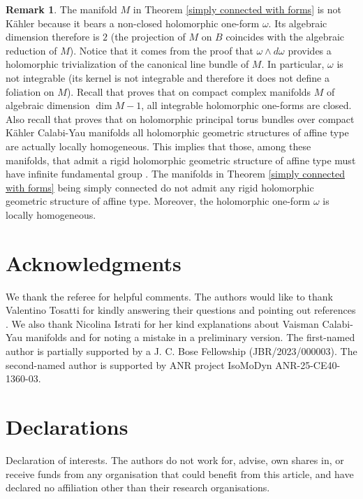 \documentclass[12pt,reqno]{amsart}
\theoremstyle{definition}
\newtheorem{remark}[theorem]{Remark}
\numberwithin{equation}{section}
\begin{document}
\begin{remark}
The manifold $M$ in Theorem \ref{simply connected with forms} is not K\"ahler because it bears a non-closed 
holomorphic one-form $\omega$. Its algebraic dimension therefore is $2$ (the projection of $M$ on $B$ 
coincides with the algebraic reduction of $M$). Notice that it comes from the proof that $\omega \wedge d 
\omega$ provides a holomorphic trivialization of the canonical line bundle of $M$. In particular, $\omega$ 
is not integrable (its kernel is not integrable and therefore it does not define a foliation on $M$). 
Recall that \cite[Proposition 1]{Br} proves that on compact complex manifolds $M$ of algebraic dimension 
$\dim M -1$, all integrable holomorphic one-forms are closed. Also recall that \cite[Theorem 1.2]{BD2} 
proves that on holomorphic principal torus bundles over compact K\"ahler Calabi-Yau manifolds all 
holomorphic geometric structures of affine type are actually locally homogeneous. This implies that those, 
among these manifolds, that admit a rigid holomorphic geometric structure of affine type must have infinite 
fundamental group \cite[Corollary 1.3]{BD2}. The manifolds in Theorem \ref{simply connected with forms} 
being simply connected do not admit any rigid holomorphic geometric structure of affine type. Moreover, the 
holomorphic one-form $\omega$ is locally homogeneous.
\end{remark}

\section*{Acknowledgments}

We thank the referee for helpful comments.
The authors would like to thank Valentino Tosatti for kindly answering their questions and pointing out 
references \cite{Boz, Ho, Fe}. We also thank Nicolina Istrati for her kind explanations about Vaisman 
Calabi-Yau manifolds and for noting a mistake in a preliminary version. The first-named author is partially 
supported by a J. C. Bose Fellowship (JBR/2023/000003). The second-named author is supported by ANR project 
IsoMoDyn ANR-25-CE40-1360-03.

\section*{Declarations}

Declaration of interests. The authors do not work for, advise, own shares in, or receive
funds from any organisation that could benefit from this article, and have declared no
affiliation other than their research organisations.
\end{document}
